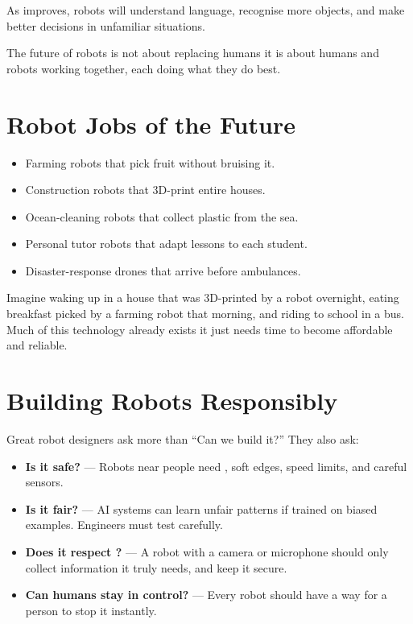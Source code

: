As  improves, robots will understand language,
recognise more objects, and make better decisions in unfamiliar situations.

\begin{bigidea}
  The future of robots is not about replacing humans \textemdash{}
  it is about humans and robots working together, each doing
  what they do best.
\end{bigidea}

\sectionrule

\section*{Robot Jobs of the Future}

\begin{itemize}
  \item Farming robots that pick fruit without bruising it.
  \item Construction robots that 3D-print entire houses.
  \item Ocean-cleaning robots that collect plastic from the sea.
  \item Personal tutor robots that adapt lessons to each student.
  \item Disaster-response drones that arrive before ambulances.
\end{itemize}

\begin{picturethis}
  Imagine waking up in a house that was 3D-printed by a robot overnight,
  eating breakfast picked by a farming robot that morning, and riding
  to school in a  bus. Much of this technology already exists
  \textemdash{} it just needs time to become affordable and reliable.
\end{picturethis}

\sectionrule


\section*{Building Robots Responsibly}

Great robot designers ask more than ``Can we build it?'' They also ask:

\begin{itemize}
  \item \textbf{Is it safe?} --- Robots near people need , soft edges,
    speed limits, and careful sensors.
  \item \textbf{Is it fair?} --- AI systems can learn unfair patterns if trained
    on biased examples. Engineers must test carefully.
  \item \textbf{Does it respect ?} --- A robot with a camera or microphone
    should only collect information it truly needs, and keep it secure.
  \item \textbf{Can humans stay in control?} --- Every robot should have a way for
    a person to stop it instantly.
\end{itemize}

